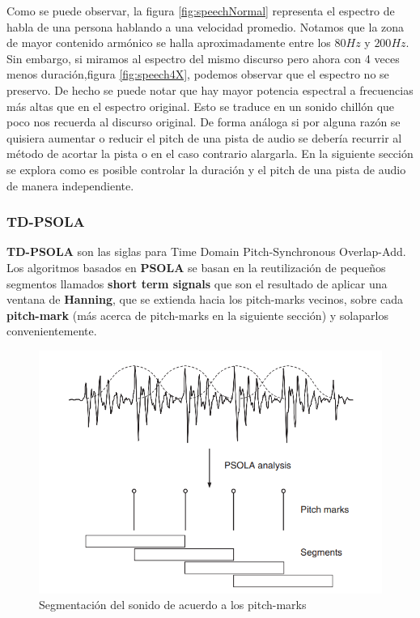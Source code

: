 Como se puede observar, la figura \ref{fig:speechNormal} representa el espectro de habla de una persona hablando a una velocidad promedio. Notamos que la zona de mayor contenido armónico se halla aproximadamente entre los $80Hz$ y $200Hz$. Sin embargo, si miramos al espectro del mismo discurso pero ahora con 4 veces menos duración,figura \ref{fig:speech4X}, podemos observar que el espectro no se preservo. De hecho se puede notar que hay mayor potencia espectral a frecuencias más altas que en el espectro original. Esto se traduce en un sonido chillón que poco nos recuerda al discurso original. De forma análoga si por alguna razón se quisiera aumentar o reducir el pitch de una pista de audio se debería recurrir al método de acortar la pista o en el caso contrario alargarla. 
En la siguiente sección se explora como es posible controlar la duración y el pitch de una pista de audio de manera independiente.

\subsubsection{TD-PSOLA}
\textbf{TD-PSOLA} son las siglas para Time Domain Pitch-Synchronous Overlap-Add. 
\\
Los algoritmos basados en \textbf{PSOLA} se basan en la reutilización de pequeños segmentos llamados \textbf{short term signals} que son el resultado de aplicar una ventana de \textbf{Hanning}, que se extienda hacia los pitch-marks vecinos, sobre cada \textbf{pitch-mark} (más acerca de pitch-marks en la siguiente sección) y solaparlos convenientemente.

\begin{figure}[H]
	\centering
	\includegraphics[width=0.7\linewidth]{ImagenesEjercicio5/PSOLA_MAIN_IDEA.PNG}
	\caption{Segmentación del sonido de acuerdo a los pitch-marks}
	\label{fig:clarification-of-the-psola-technique-adopted-from-kortekaas-1997}
\end{figure}

